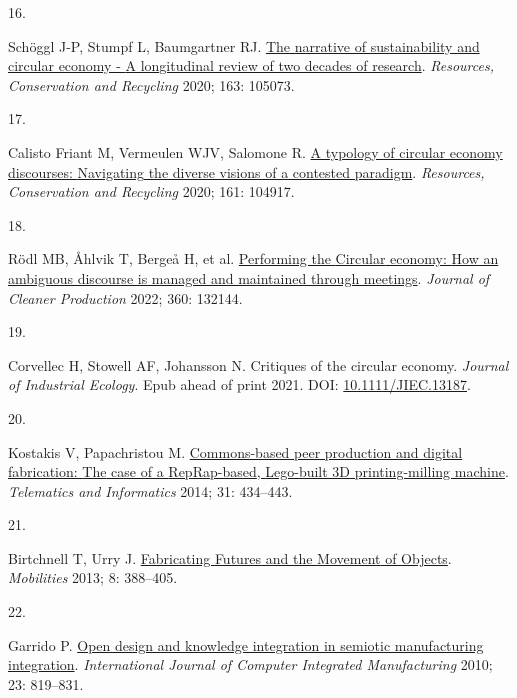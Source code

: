 \documentclass[
  11pt,
  a4paperpaper,
  onecolumn]{article}
\newlength{\cslhangindent}
\newlength{\csllabelwidth}
\newlength{\cslentryspacingunit} %
\newenvironment{CSLReferences}[2] %
 {%
  \setlength{\parindent}{0pt}
  \ifodd #1
  \let\oldpar\par
  \def\par{\hangindent=\cslhangindent\oldpar}
  \fi
  \setlength{\parskip}{#2\cslentryspacingunit}
 }%
 {}
\newcommand{\CSLLeftMargin}[1]{\parbox[t]{\csllabelwidth}{#1}}
\newcommand{\CSLRightInline}[1]{\parbox[t]{\linewidth - \csllabelwidth}{#1}\break}
\begin{document}
\begin{CSLReferences}{0}{0}
\leavevmode{}%
\CSLLeftMargin{16. }%
\CSLRightInline{Schöggl J-P, Stumpf L, Baumgartner RJ.
\href{https://doi.org/10.1016/j.resconrec.2020.105073}{The narrative of
sustainability and circular economy - {A} longitudinal review of two
decades of research}. \emph{Resources, Conservation and Recycling} 2020;
163: 105073.}

\leavevmode{}%
\CSLLeftMargin{17. }%
\CSLRightInline{Calisto Friant M, Vermeulen WJV, Salomone R.
\href{https://doi.org/10.1016/j.resconrec.2020.104917}{A typology of
circular economy discourses: {Navigating} the diverse visions of a
contested paradigm}. \emph{Resources, Conservation and Recycling} 2020;
161: 104917.}

\leavevmode{}%
\CSLLeftMargin{18. }%
\CSLRightInline{Rödl MB, Åhlvik T, Bergeå H, et al.
\href{https://doi.org/10.1016/J.JCLEPRO.2022.132144}{Performing the
{Circular} economy: {How} an ambiguous discourse is managed and
maintained through meetings}. \emph{Journal of Cleaner Production} 2022;
360: 132144.}

\leavevmode{}%
\CSLLeftMargin{19. }%
\CSLRightInline{Corvellec H, Stowell AF, Johansson N. Critiques of the
circular economy. \emph{Journal of Industrial Ecology}. Epub ahead of
print 2021. DOI:
\href{https://doi.org/10.1111/JIEC.13187}{10.1111/JIEC.13187}.}

\leavevmode{}%
\CSLLeftMargin{20. }%
\CSLRightInline{Kostakis V, Papachristou M.
\href{https://doi.org/10.1016/j.tele.2013.09.006}{Commons-based peer
production and digital fabrication: {The} case of a {RepRap-based},
{Lego-built 3D} printing-milling machine}. \emph{Telematics and
Informatics} 2014; 31: 434--443.}

\leavevmode{}%
\CSLLeftMargin{21. }%
\CSLRightInline{Birtchnell T, Urry J.
\href{https://doi.org/10.1080/17450101.2012.745697}{Fabricating
{Futures} and the {Movement} of {Objects}}. \emph{Mobilities} 2013; 8:
388--405.}

\leavevmode{}%
\CSLLeftMargin{22. }%
\CSLRightInline{Garrido P.
\href{https://doi.org/10.1080/0951192X.2010.490923}{Open design and
knowledge integration in semiotic manufacturing integration}.
\emph{International Journal of Computer Integrated Manufacturing} 2010;
23: 819--831.}


\end{CSLReferences}
\end{document}
